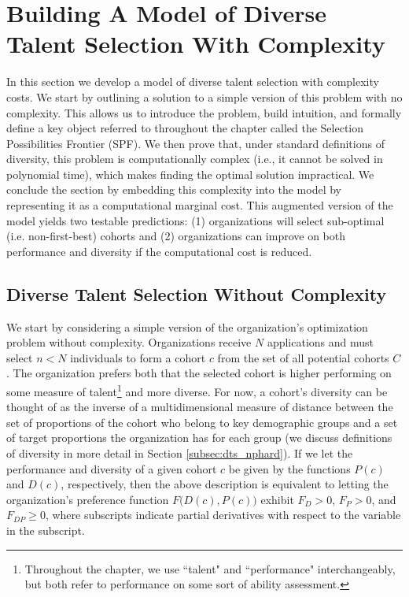 \section{Building A Model of Diverse Talent Selection With Complexity}\label{sec:model}

In this section we develop a model of diverse talent selection with complexity costs. We start by outlining a solution to a simple version of this problem with no complexity. This allows us to introduce the problem, build intuition, and formally define a key object referred to throughout the chapter called the Selection Possibilities Frontier (SPF). We then prove that, under standard definitions of diversity, this problem is computationally complex (i.e., it cannot be solved in polynomial time), which makes finding the optimal solution impractical. We conclude the section by embedding this complexity into the model by representing it as a computational marginal cost. This augmented version of the model yields two testable predictions: (1) organizations will select sub-optimal (i.e. non-first-best) cohorts and (2) organizations can improve on both performance and diversity if the computational cost is reduced. 

\subsection{Diverse Talent Selection Without Complexity}\label{subsec:simple_model}

We start by considering a simple version of the organization's optimization problem without complexity. Organizations receive $N$ applications and must select $n<N$ individuals to form a cohort $c$ from the set of all potential cohorts $C$. The organization prefers both that the selected cohort is higher performing on some measure of talent\footnote{Throughout the chapter, we use ``talent" and ``performance" interchangeably, but both refer to performance on some sort of ability assessment.} and more diverse. For now, a cohort's diversity can be thought of as the inverse of a multidimensional measure of distance between the set of proportions of the cohort who belong to key demographic groups and a set of target proportions the organization has for each group (we discuss definitions of diversity in more detail in Section \ref{subsec:dts_nphard}). If we let the performance and diversity of a given cohort $c$ be given by the functions $P(c)$ and $D(c)$, respectively, then the above description is equivalent to letting the organization's preference function $F\Big(D(c),P(c)\Big)$ exhibit $F_D>0$, $F_P>0$, and $F_{DP}\geq0$, where subscripts indicate partial derivatives with respect to the variable in the subscript. 

